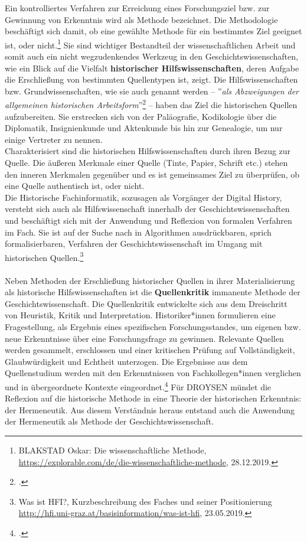 \documentclass[12pt,a4paper]{article}
\begin{document}
Ein kontrolliertes Verfahren zur Erreichung eines Forschungsziel bzw. zur Gewinnung von Erkenntnis wird als Methode bezeichnet. Die Methodologie beschäftigt sich damit, ob eine gewählte Methode für ein bestimmtes Ziel geeignet ist, oder nicht.\footnote{BLAKSTAD Oskar: Die wissenschaftliche Methode, \url{https://explorable.com/de/die-wissenschaftliche-methode}, 28.12.2019.} Sie sind wichtiger Bestandteil der wissenschaftlichen Arbeit und somit auch ein nicht wegzudenkendes Werkzeug in den Geschichtswissenschaften, wie ein Blick auf die Vielfalt \textbf{historischer Hilfswissenschaften}, deren Aufgabe die Erschließung von bestimmten Quellentypen ist, zeigt. Die Hilfswissenschaften bzw. Grundwissenschaften, wie sie auch genannt werden -- ''\textit{als Abzweigungen der allgemeinen historischen Arbeitsform}''\footcite[Vgl.][S.10]{von2007werkzeug} -- haben das Ziel die historischen Quellen aufzubereiten. Sie erstrecken sich von der Paläografie, Kodikologie über die Diplomatik, Insignienkunde und Aktenkunde bis hin zur Genealogie, um nur einige Vertreter zu nennen. 
\\
Charakterisiert sind die historischen Hilfswissenschaften durch ihren Bezug zur Quelle. Die äußeren Merkmale einer Quelle (Tinte, Papier, Schrift etc.) stehen den inneren Merkmalen gegenüber und es ist gemeinsames Ziel zu überprüfen, ob eine Quelle authentisch ist, oder nicht.
\\
Die Historische Fachinformatik, sozusagen als Vorgänger der Digital History, versteht sich auch als Hilfswissenschaft innerhalb der Geschichtswissenschaften und beschäftigt sich mit der Anwendung und Reflexion von formalen Verfahren im Fach. Sie ist auf der Suche nach in Algorithmen ausdrückbaren, sprich formalisierbaren, Verfahren der Geschichtswissenschaft im Umgang mit historischen Quellen.\footnote{Was ist HFI?, Kurzbeschreibung des Faches und seiner Positionierung \protect\url{http://hfi.uni-graz.at/basisinformation/was-ist-hfi}, 23.05.2019.} 
\\
\\
Neben Methoden der Erschließung historischer Quellen in ihrer Materialisierung als historische Hilfswissenschaften ist die \textbf{Quellenkritik} immanente Methode der Geschichtswissenschaft. Die Quellenkritik entwickelte sich aus dem Dreischritt von Heuristik, Kritik und Interpretation. Historiker*innen formulieren eine Fragestellung, als Ergebnis eines spezifischen Forschungsstandes, um eigenen bzw. neue Erkenntnisse über eine Forschungsfrage zu gewinnen. Relevante Quellen werden gesammelt, erschlossen und einer kritischen Prüfung auf Vollständigkeit, Glaubwürdigkeit und Echtheit unterzogen. Die Ergebnisse aus dem Quellenstudium werden mit den Erkenntnissen von Fachkollegen*innen verglichen und in übergeordnete Kontexte eingeordnet.\footcite[][S.43-45]{jordan2018theorien} Für DROYSEN mündet die Reflexion auf die historische Methode in eine Theorie der historischen Erkenntnis: der Hermeneutik. Aus diesem Verständnis heraus entstand auch die Anwendung der Hermeneutik als Methode der Geschichtswissenschaft.
\end{document}

